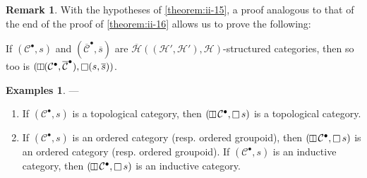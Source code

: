 \documentclass[a4paper,fleqn]{article}
\theoremstyle{plain}
\newenvironment{theorem}[1]
  {\renewcommand\theinnertheorem{#1}\innertheorem}
  {\endinnertheorem}
\theoremstyle{definition}
\newtheorem*{remark}{Remark}
\newtheorem*{examples}{Examples}
\newcommand{\CC}{\mathcal{C}}
\newcommand{\HH}{\mathcal{H}}
\newcommand{\vsqbox}{{\rotatebox{90}{$\boxminus$}}}
\DeclareMathOperator{\sq}{\square}
\DeclareMathOperator{\vsq}{\raisebox{-.1em}{$\vsqbox$}}
\newcommand{\smallbullet}{\bullet}
\begin{document}
\begin{remark}
  With the hypotheses of \cref{theorem:ii-15}, a proof analogous to that of the end of the proof of \cref{theorem:ii-16} allows us to prove the following:
\end{remark}

\begin{theorem}{15~bis}
\label{theorem:ii-15bis}
  If $(\CC^\smallbullet,s)$ and $(\overline{\CC}^\smallbullet,\overline{s})$ are $\overline{\HH}((\HH',\HH'),\HH)$-structured categories, then so too is $(\vsq(\CC^\smallbullet,\overline{\CC}^\smallbullet),\sq(s,\overline{s}))$.
\end{theorem}

\begin{examples}
  ---
  \begin{enumerate}
    \item[\normalfont(1)]
      If $(\CC^\smallbullet,s)$ is a topological category, then $(\vsq\CC^\smallbullet,\sq s)$ is a topological category.

    \item[\normalfont(2)]
      If $(\CC^\smallbullet,s)$ is an ordered category (resp. ordered groupoid), then $(\vsq\CC^\smallbullet,\sq s)$ is an ordered category (resp. ordered groupoid).
      If $(\CC^\smallbullet,s)$ is an inductive category, then $(\vsq\CC^\smallbullet,\sq s)$ is an inductive category.


\end{enumerate}
\end{examples}
\end{document}
